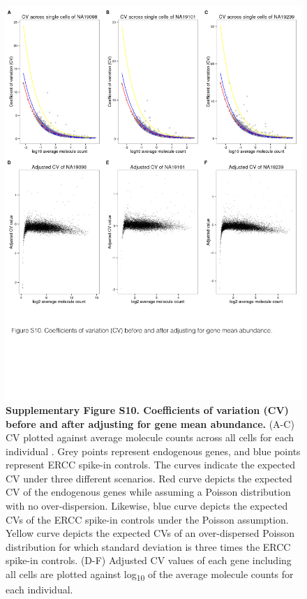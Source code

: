 \begin{figure}[htbp]
\centering
\includegraphics[width=5in]{img/ch04/Figure15.jpeg}
\caption{\textbf{Supplementary Figure S10. Coefficients of variation
(CV) before and after adjusting for gene mean abundance.} (A-C) CV
plotted against average molecule counts across all cells for each
individual \citep{Islam2014}. Grey points represent endogenous genes, and
blue points represent ERCC spike-in controls. The curves indicate the
expected CV under three different scenarios. Red curve depicts the
expected CV of the endogenous genes while assuming a Poisson
distribution with no over-dispersion. Likewise, blue curve depicts the
expected CVs of the ERCC spike-in controls under the Poisson assumption.
Yellow curve depicts the expected CVs of an over-dispersed Poisson
distribution for which standard deviation is three times the ERCC
spike-in controls. (D-F) Adjusted CV values of each gene including all
cells are plotted against log\textsubscript{10} of the average molecule
counts for each individual.}
\end{figure}

